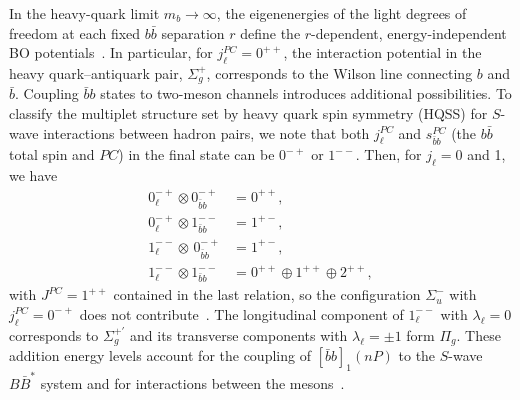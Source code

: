 \documentclass[aps,prl,showpacs,amsmath,twocolumn,superscriptaddress,floatfix,nofootinbib,notitlepage]{revtex4-2}
\newcommand{\bbnP}{[\bar{b}b]_1(nP)}
\newcommand{\be}{\begin{equation}}
\newcommand{\ee}{\end{equation}}
\begin{document}
In the heavy-quark limit $m_b{\to}\infty$, the eigenenergies of the light degrees of freedom at each fixed $b\bar{b}$ separation $r$ define the $r$-dependent, energy-independent BO potentials~\cite{Juge:1997nc,Braaten:2014qka}. In particular, for $j_{\ell}^{PC}=0^{++}$, the interaction potential in the heavy quark--antiquark pair, $\Sigma_g^+$, corresponds to the Wilson line connecting $b$ and $\bar{b}$. Coupling $\bar{b}b$ states to two-meson channels introduces additional possibilities.
To classify the multiplet structure set by heavy quark spin symmetry (HQSS) for $S$-wave interactions between hadron pairs, we note that both $j_{\ell}^{PC}$ and $s_{\bar{b}b}^{PC}$ (the $b\bar{b}$ total spin and $PC$) in the final state can be $0^{-+}$ or $1^{--}$. Then, for $j_{\ell}=0$ and 1, we have~\cite{Bondar:2011ev,Guo:2017jvc}
\be
\begin{split}
0_{\ell}^{-+} \otimes 0_{\bar{b}b}^{-+}&=0^{++},\\
0_{\ell}^{-+} \otimes 1_{\bar{b}b}^{--}&=1^{+-},\\
1_{\ell}^{--} \otimes\, 0_{\bar{b}b}^{-+}&=1^{+-},\\
1_{\ell}^{--} \otimes 1_{\bar{b}b}^{--}&=0^{++} \oplus 1^{++} \oplus 2^{++},
\label{eq:qn}
\end{split}
\ee
with $J^{PC}=1^{++}$ contained in the last relation, so the configuration $\Sigma_u^-$ with $j_\ell^{PC}=0^{-+}$ does not contribute~\cite{Berwein:2024ztx,Brambilla:2026zfw}. The longitudinal component of $1_\ell^{--}$ with $\lambda_\ell=0$ corresponds to $\Sigma_g^{+\prime}$ and its transverse components with $\lambda_\ell=\pm1$ form $\Pi_g$. These addition energy levels account for the coupling of $\bbnP$ to the $S$-wave $B\bar{B}^*$ system and for interactions between the mesons~\cite{Berwein:2024ztx,Brambilla:2026zfw}.
\end{document}
